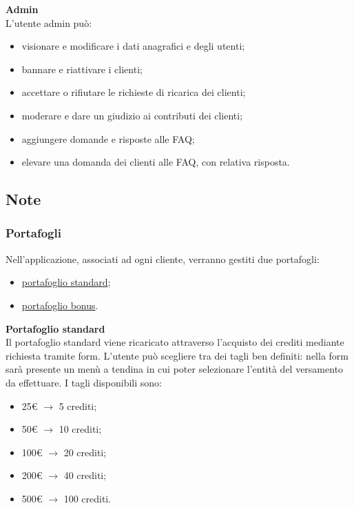 \documentclass[a4paper, 14pt]{article}
\begin{document}
\begin{flushleft}
			\bigskip \textbf{Admin} \\ \smallskip
			L'utente admin può:
			\begin{itemize}
				\item visionare e modificare i dati anagrafici e degli utenti;
				\item bannare e riattivare i clienti;
				\item accettare o rifiutare le richieste di ricarica dei clienti;
				\item moderare e dare un giudizio ai contributi dei clienti;
				\item aggiungere domande e risposte alle FAQ;
				\item elevare una domanda dei clienti alle FAQ, con relativa risposta.
			\end{itemize}
		
		\subsection{Note}
			\subsubsection{Portafogli} \label{Portafogli}
				Nell'applicazione, associati ad ogni cliente, verranno gestiti due portafogli:
				\begin{itemize}
					\item \underline{portafoglio standard};
					\item \underline{portafoglio bonus}.
				\end{itemize}

				\bigskip \textbf{Portafoglio standard} \\ \smallskip \label{PortSTD}			
				Il portafoglio standard viene ricaricato attraverso l’acquisto dei crediti mediante richiesta tramite form.
				L’utente può scegliere tra dei tagli ben definiti: nella form sarà presente un menù a tendina in cui poter selezionare l'entità del versamento da effettuare.
				I tagli disponibili sono:
				\begin{itemize}
					\item 25\euro \> $\rightarrow$ 5 crediti;
					\item 50\euro \> $\rightarrow$ 10 crediti;
					\item 100\euro \> $\rightarrow$ 20 crediti;
					\item 200\euro \> $\rightarrow$ 40 crediti;
					\item 500\euro \> $\rightarrow$ 100 crediti.
				\end{itemize}
				

\end{flushleft}
\end{document}
